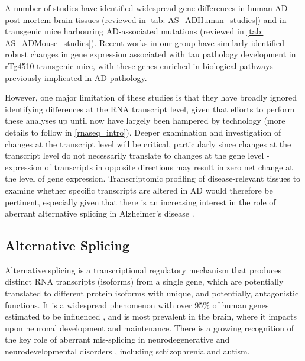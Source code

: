 A number of studies have identified widespread gene differences in human AD post-mortem brain tissues (reviewed in \cref{tab: AS_ADHuman_studies}) and in transgenic mice harbouring AD-associated mutations (reviewed in \cref{tab: AS_ADMouse_studies}). Recent works in our group have similarly identified robust changes in gene expression associated with tau pathology development in rTg4510 transgenic mice, with these genes enriched in biological pathways previously implicated in AD pathology\cite{Castanho2020}. 

However, one major limitation of these studies is that they have broadly ignored identifying differences at the RNA transcript level, given that efforts to perform these analyses up until now have largely been hampered by technology (more details to follow in \cref{rnaseq_intro}). Deeper examination and investigation of changes at the transcript level will be critical, particularly since changes at the transcript level do not necessarily translate to changes at the gene level - expression of transcripts in opposite directions may result in zero net change at the level of gene expression. Transcriptomic profiling of disease-relevant tissues to examine whether specific transcripts are altered in AD would therefore be pertinent, especially given that there is an increasing interest in the role of aberrant alternative splicing in Alzheimer's disease \cite{Raj2018}.

\subsection{Alternative Splicing}\label{intro:AS}
Alternative splicing is a transcriptional regulatory mechanism that produces distinct RNA transcripts (isoforms) from a single gene, which are potentially translated to different protein isoforms with unique, and potentially, antagonistic functions\cite{Wang2008}. It is a widespread phenomenon with over 95\% of human genes estimated to be influenced \cite{Pan2008}, and is most prevalent in the brain\cite{Yeo2004}, where it impacts upon neuronal development and maintenance\cite{Pan2008, Mazin2014, Raj2015}. There is a growing recognition of the key role of aberrant mis-splicing in neurodegenerative and neurodevelopmental disorders \cite{Gandal2018,RL2019}, including schizophrenia and autism. 

